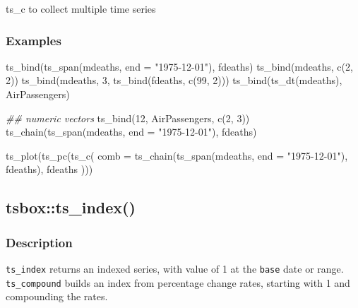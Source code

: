 \documentclass[
  letterpaper,
  DIV=11,
  numbers=noendperiod]{scrreport}
\newenvironment{Shaded}{\begin{snugshade}}{\end{snugshade}}
\newcommand{\AttributeTok}[1]{\textcolor[rgb]{0.40,0.45,0.13}{#1}}
\newcommand{\DecValTok}[1]{\textcolor[rgb]{0.68,0.00,0.00}{#1}}
\newcommand{\DocumentationTok}[1]{\textcolor[rgb]{0.37,0.37,0.37}{\textit{#1}}}
\newcommand{\FunctionTok}[1]{\textcolor[rgb]{0.28,0.35,0.67}{#1}}
\newcommand{\NormalTok}[1]{\textcolor[rgb]{0.00,0.23,0.31}{#1}}
\newcommand{\StringTok}[1]{\textcolor[rgb]{0.13,0.47,0.30}{#1}}
\begin{document}
ts\_c to collect multiple time series

\subsubsection{Examples}\label{examples-34}

\begin{Shaded}
\begin{Highlighting}[]
\FunctionTok{ts\_bind}\NormalTok{(}\FunctionTok{ts\_span}\NormalTok{(mdeaths, }\AttributeTok{end =} \StringTok{"1975{-}12{-}01"}\NormalTok{), fdeaths)}
\FunctionTok{ts\_bind}\NormalTok{(mdeaths, }\FunctionTok{c}\NormalTok{(}\DecValTok{2}\NormalTok{, }\DecValTok{2}\NormalTok{))}
\FunctionTok{ts\_bind}\NormalTok{(mdeaths, }\DecValTok{3}\NormalTok{, }\FunctionTok{ts\_bind}\NormalTok{(fdeaths, }\FunctionTok{c}\NormalTok{(}\DecValTok{99}\NormalTok{, }\DecValTok{2}\NormalTok{)))}
\FunctionTok{ts\_bind}\NormalTok{(}\FunctionTok{ts\_dt}\NormalTok{(mdeaths), AirPassengers)}

\DocumentationTok{\#\# numeric vectors}
\FunctionTok{ts\_bind}\NormalTok{(}\DecValTok{12}\NormalTok{, AirPassengers, }\FunctionTok{c}\NormalTok{(}\DecValTok{2}\NormalTok{, }\DecValTok{3}\NormalTok{))}
\FunctionTok{ts\_chain}\NormalTok{(}\FunctionTok{ts\_span}\NormalTok{(mdeaths, }\AttributeTok{end =} \StringTok{"1975{-}12{-}01"}\NormalTok{), fdeaths)}

\FunctionTok{ts\_plot}\NormalTok{(}\FunctionTok{ts\_pc}\NormalTok{(}\FunctionTok{ts\_c}\NormalTok{(}
  \AttributeTok{comb =} \FunctionTok{ts\_chain}\NormalTok{(}\FunctionTok{ts\_span}\NormalTok{(mdeaths, }\AttributeTok{end =} \StringTok{"1975{-}12{-}01"}\NormalTok{), fdeaths),}
\NormalTok{  fdeaths}
\NormalTok{)))}
\end{Highlighting}
\end{Shaded}

\subsection{tsbox::ts\_index()}\label{tsboxts_index}

\subsubsection{Description}\label{description-35}

\texttt{ts\_index} returns an indexed series, with value of 1 at the
\texttt{base} date or range. \texttt{ts\_compound} builds an index from
percentage change rates, starting with 1 and compounding the rates.
\end{document}
